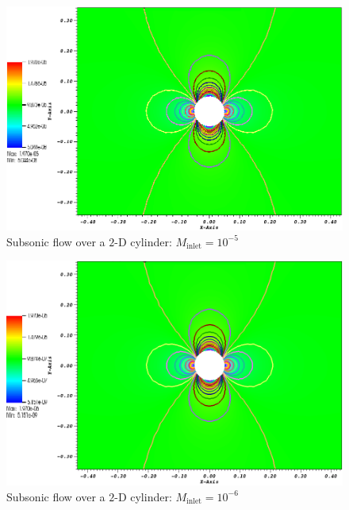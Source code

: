         \begin{figure}[H]
                \centering
                \includegraphics[width=\textwidth]{figures/CylinderMach1em5ZoomIn.png}
                \caption{Subsonic flow over a $2$-D cylinder: $M_{\text{inlet}}=10^{-5}$}
                \label{fig:cyl_1em5}
        \end{figure}

        \begin{figure}[H]
                \centering
                \includegraphics[width=\textwidth]{figures/CylinderMach1em6ZoomIn.png}
                \caption{Subsonic flow over a $2$-D cylinder: $M_{\text{inlet}}=10^{-6}$}
                \label{fig:cyl_1em6}
        \end{figure}

